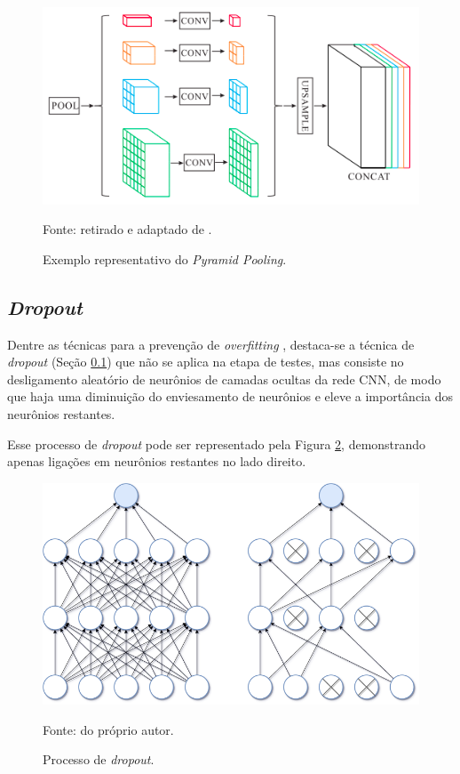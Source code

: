 \begin{figure}[H]
    \centering
    \caption{Exemplo representativo do \textit{Pyramid Pooling}.}
    \includegraphics[width=1\textwidth]{recursos/imagens/proposal/pyramidal.png}
    \label{proposal:pcapooling:fig:2}

    Fonte: retirado e adaptado de \cite{Zhao2017}.
\end{figure}

\subsection{\textit{Dropout}}
\label{cnn:dropout}

\begin{sloppypar}
Dentre as técnicas para a prevenção de \textit{overfitting} \cite{Goodfellow2016}, destaca-se a técnica de \textit{dropout} (Seção \ref{cnn:dropout}) que não se aplica na etapa de testes, mas consiste no desligamento aleatório de neurônios de camadas ocultas da rede CNN, de modo que haja uma diminuição do enviesamento de neurônios e eleve a importância dos neurônios restantes.
\end{sloppypar}

Esse processo de \textit{dropout} pode ser representado pela Figura \ref{cnn:fig:9}, demonstrando apenas ligações em neurônios restantes no lado direito.

\begin{figure}[H]
    \centering
    \caption{Processo de \textit{dropout}.}
    \includegraphics[width=1\linewidth]{recursos/imagens/deep/dropout.png}
    \label{cnn:fig:9}

     Fonte: do próprio autor.
\end{figure}


